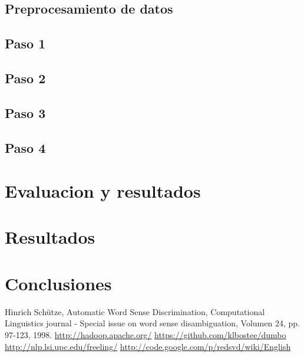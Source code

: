 \documentclass[10pt]{article}
\begin{document}
\subsection{Preprocesamiento de datos}

\subsection{Paso 1}
\subsection{Paso 2}
\subsection{Paso 3}
\subsection{Paso 4}

\section{Evaluacion y resultados}
\section{Resultados}


\section{Conclusiones}

\begin{thebibliography}{99}

 Hinrich Schütze, Automatic Word Sense Discrimination, Computational Linguistics journal - Special issue on word sense disambiguation, Volumen 24, pp. 97-123, 1998.
 \url{http://hadoop.apache.org/}
 \url{https://github.com/klbostee/dumbo}
 \url{http://nlp.lsi.upc.edu/freeling/}
 \url{http://code.google.com/p/redsvd/wiki/English}
\end{thebibliography}
\end{document}
